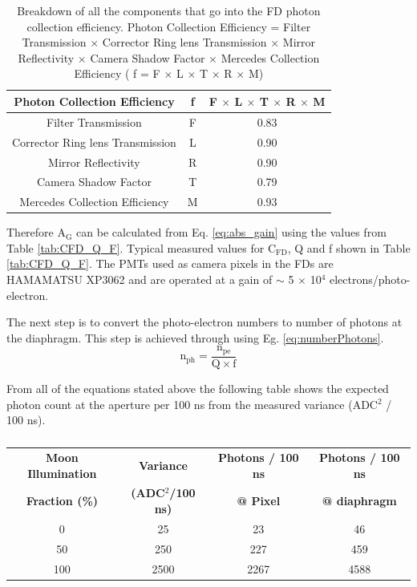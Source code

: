 \begin{table}[h]
\centering
\begin{tabular}{|c|c|c|}
\hline
Photon Collection Efficiency & f & F $\times$ L $\times$ T $\times$ R $\times$ M \\ \hline
Filter Transmission & F & 0.83 \\ \hline
Corrector Ring lens Transmission & L & 0.90 \\ \hline
Mirror Reflectivity & R & 0.90 \\ \hline
Camera Shadow Factor & T & 0.79 \\ \hline
Mercedes Collection Efficiency & M & 0.93 \\ \hline
\end{tabular}
\caption{Breakdown of all the components that go into the FD photon collection efficiency. Photon Collection Efficiency = Filter Transmission $\times$ Corrector Ring lens Transmission $\times$ Mirror Reflectivity $\times$ Camera Shadow Factor $\times$ Mercedes Collection Efficiency ( f = F $\times$ L $\times$ T $\times$ R $\times$ M)}\label{tab:OpticsBreakdown}
\end{table}

Therefore A$_{\mathrm{G}}$ can be calculated from Eq. \ref{eq:abs_gain} using the values from Table \ref{tab:CFD_Q_F}. Typical measured values for C$_{\mathrm{FD}}$, Q and f shown in Table \ref{tab:CFD_Q_F}. The PMTs used as camera pixels in the FDs are HAMAMATSU XP3062 and are operated at a gain of $\sim$ 5 $\times$ 10$^4$ electrons/photo-electron.

The next step is to convert the photo-electron numbers to number of photons at the diaphragm. This step is achieved through using Eg. \ref{eq:numberPhotons}.
\begin{equation}
\mathrm{n}_{\mathrm{ph}} = \frac{\mathrm{n}_{\mathrm{pe}}}{\mathrm{Q} \times \mathrm{f}} \label{eq:numberPhotons}
\end{equation}

From all of the equations stated above the following table shows the expected photon count at the aperture per 100 ns from the measured variance (ADC$^2$ / 100 ns).
\begin{table}
\begin{center}
\begin{tabular}{| c | c | c | c | }
\hline \hline
\textbf{Moon Illumination} & \textbf{Variance} & \textbf{Photons / 100 ns} & \textbf{Photons / 100 ns} \\
\textbf{Fraction (\%)} &\textbf{(ADC$^2$/100 ns)} & \textbf{@ Pixel} & \textbf{@ diaphragm} \\
\hline \hline
0 & 25  & 23 & 46 \\
\hline
50 & 250  & 227 & 459 \\
\hline
100 & 2500  & 2267 & 4588 \\
\hline
\end{tabular}
\end{center}
\caption{}
\end{table}

